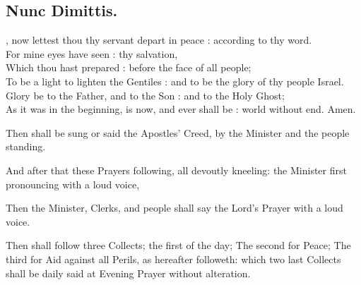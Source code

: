 \subsection{Nunc Dimittis.}

, now lettest thou thy servant depart in peace : according to thy word.\\
For mine eyes have seen : thy salvation,\\
Which thou hast prepared : before the face of all people;\\
To be a light to lighten the Gentiles : and to be the glory of thy people Israel.\\
Glory be to the Father, and to the Son : and to the Holy Ghost;\\
As it was in the beginning, is now, and ever shall be : world without end. Amen.

\begin{rubric}
Then shall be sung or said the Apostles' Creed, by the Minister and the people standing.
\end{rubric}



\begin{rubric}
And after that these Prayers following, all devoutly kneeling: the Minister first pronouncing with a loud voice,
\end{rubric}




\begin{rubric}
Then the Minister, Clerks, and people shall say the Lord's Prayer with a loud voice.
\end{rubric}




\begin{rubric}
Then shall follow three Collects; the first of the day; The second for Peace; The third for Aid against all Perils, as hereafter followeth: which two last Collects shall be daily said at Evening Prayer without alteration.
\end{rubric}

